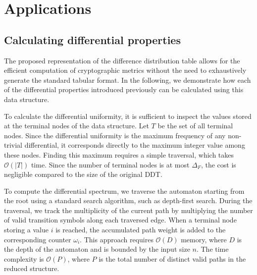 \section{Applications}
\label{sec:applications}

\subsection{Calculating differential properties}

The proposed representation of the difference distribution table allows for the efficient computation of cryptographic metrics without the need to exhaustively generate the standard tabular format. In the following, we demonstrate how each of the differential properties introduced previously can be calculated using this data structure.

To calculate the differential uniformity, it is sufficient to inspect the values stored at the terminal nodes of the data structure. Let $T$ be the set of all terminal nodes. Since the differential uniformity is the maximum frequency of any non-trivial differential, it corresponds directly to the maximum integer value among these nodes. Finding this maximum requires a simple traversal, which takes $\mathcal{O}(|T|)$ time. Since the number of terminal nodes is at most $\Delta_{F}$, the cost is negligible compared to the size of the original DDT.

To compute the differential spectrum, we traverse the automaton starting from the root using a standard search algorithm, such as depth-first search. During the traversal, we track the multiplicity of the current path by multiplying the number of valid transition symbols along each traversed edge. When a terminal node storing a value $i$ is reached, the accumulated path weight is added to the corresponding counter $\omega_i$. This approach requires $\mathcal{O}(D)$ memory, where $D$ is the depth of the automaton and is bounded by the input size $n$. The time complexity is $\mathcal{O}(P)$, where $P$ is the total number of distinct valid paths in the reduced structure.

